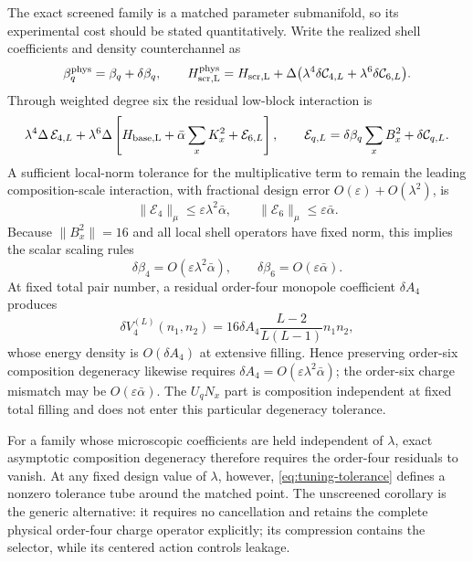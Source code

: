 \documentclass[11pt]{article}
\theoremstyle{definition}
\theoremstyle{remark}
\newcommand{\cE}{\mathcal E}
\newcommand{\cC}{\mathcal C}
\newcommand{\norm}[1]{\lVert #1\rVert}
\begin{document}
The exact screened family is a matched parameter submanifold, so its experimental cost should be stated quantitatively.  Write the realized shell coefficients and density counterchannel as
\begin{equation}
 \beta_q^{\rm phys}=\beta_q+\delta\beta_q,
 \qquad
 H_{\rm scr,L}^{\rm phys}=H_{\rm scr,L}
 +\Delta\bigl(\lambda^4\delta\cC_{4,L}+\lambda^6\delta\cC_{6,L}\bigr).
\end{equation}
Through weighted degree six the residual low-block interaction is
\begin{equation}
 \lambda^4\Delta\,\cE_{4,L}
 +\lambda^6\Delta\left[H_{\rm base,L}+\bar\alpha\sum_xK_x^2+\cE_{6,L}\right],
 \qquad
 \cE_{q,L}=\delta\beta_q\sum_xB_x^2+\delta\cC_{q,L}.
 \label{eq:mismatch-effective}
\end{equation}
A sufficient local-norm tolerance for the multiplicative term to remain the leading composition-scale interaction, with fractional design error $O(\varepsilon)+O(\lambda^2)$, is
\begin{equation}
 \boxed{
 \norm{\cE_{4}}_\mu\le \varepsilon\lambda^2\bar\alpha,
 \qquad
 \norm{\cE_{6}}_\mu\le \varepsilon\bar\alpha.}
 \label{eq:tuning-tolerance}
\end{equation}
Because $\norm{B_x^2}=16$ and all local shell operators have fixed norm, this implies the scalar scaling rules
\begin{equation}
 \delta\beta_4=O(\varepsilon\lambda^2\bar\alpha),
 \qquad
 \delta\beta_6=O(\varepsilon\bar\alpha).
 \label{eq:beta-tolerances}
\end{equation}
At fixed total pair number, a residual order-four monopole coefficient $\delta A_4$ produces
\begin{equation}
 \delta V_4^{(L)}(n_1,n_2)
 =16\delta A_4\frac{L-2}{L(L-1)}n_1n_2,
\end{equation}
whose energy density is $O(\delta A_4)$ at extensive filling.  Hence preserving order-six composition degeneracy likewise requires $\delta A_4=O(\varepsilon\lambda^2\bar\alpha)$; the order-six charge mismatch may be $O(\varepsilon\bar\alpha)$.  The $U_qN_x$ part is composition independent at fixed total filling and does not enter this particular degeneracy tolerance.

For a family whose microscopic coefficients are held independent of $\lambda$, exact asymptotic composition degeneracy therefore requires the order-four residuals to vanish.  At any fixed design value of $\lambda$, however, \eqref{eq:tuning-tolerance} defines a nonzero tolerance tube around the matched point.  The unscreened corollary is the generic alternative: it requires no cancellation and retains the complete physical order-four charge operator explicitly; its compression contains the selector, while its centered action controls leakage.
\end{document}
